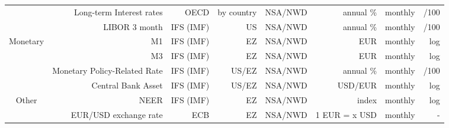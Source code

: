 \documentclass[11pt,a4paper]{article}
\begin{document}
\begin{center}
\begin{table}[h]
{\begin{tabular}{crrrrrrr}
     &
      Long-term Interest rates &
      OECD &
      by country &
      NSA/NWD &
      annual \% & 
      monthly &
      /100
      \\
     &
      LIBOR 3 month &
      IFS (IMF) &
      US &
      NSA/NWD &
      annual \% &
      monthly &
      /100
      \\
      \midrule
    \multirow{4}[8]{*}{Monetary} &
      M1 &
      IFS (IMF) &
      EZ &
      NSA/NWD &
      EUR &
      monthly &
      log
      \\
     &
      M3 &
      IFS (IMF) &
      EZ &
      NSA/NWD &
      EUR &
      monthly &
      log
      \\
     &
      Monetary Policy-Related Rate &
      IFS (IMF) &
      US/EZ &
      NSA/NWD &
      annual \% &
      monthly &
      /100
      \\
     &
      Central Bank Asset &
      IFS (IMF) &
      US/EZ &
      NSA/NWD &
      USD/EUR &
      monthly &
      log
      \\
      \midrule
    \multirow{2}[4]{*}{Other} &
      NEER &
      IFS (IMF) &
      EZ &
      NSA/NWD &
      index &
      monthly &
      log
      \\
     &
      EUR/USD exchange rate &
      ECB &
      EZ &
      NSA/NWD &
      1 EUR = x USD &
      monthly &
      -
      
      \\
    \bottomrule
    \end{tabular}
    }

\end{table}
\end{center}
\end{document}
